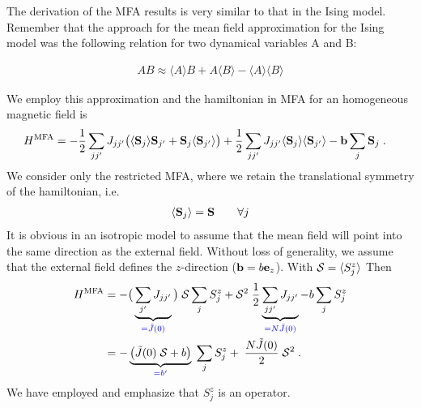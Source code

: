 The derivation of the MFA results is very similar to that in the Ising model. Remember that the approach for the mean field approximation for the Ising model was the following relation for two dynamical variables A and B:

\begin{align*}
AB \approx \langle A\rangle B + A\langle B\rangle - \langle A\rangle\langle B\rangle
\end{align*}

We employ this approximation and the  hamiltonian in MFA for an homogeneous magnetic field is
%
\begin{align}\label{eq:}
H^\text{MFA} &= -\frac{1}{2}\sum_{jj'} J_{jj'} \big(\langle \mathbf S_{j} \rangle\mathbf S_{j'} +
 \mathbf S_{j}  \langle \mathbf S_{j'} \rangle \big)+ \frac{1}{2}\sum_{jj'} J_{jj'} \langle \mathbf S_{j} \rangle\langle \mathbf S_{j'} \rangle - \mathbf b \sum_{j} \mathbf S_{j}\;.
\end{align}
%
We consider only the restricted MFA, where we retain the  translational symmetry of the 
hamiltonian, i.e.
%
\begin{align*}
\langle \mathbf S_{j} \rangle =\mathbf S \qquad \forall j
\end{align*}
%
It is obvious in an isotropic model to assume that the mean field will point into the same 
direction as the external field. Without loss of generality, 
we assume that the external field defines the $z$-direction ($\mathbf b = b\mathbf e_{z}$). With ${\cal S} = \langle S^{z}_{j} \rangle$
Then
\begin{align*}
H^\text{MFA} &= -  \big(\underbrace{
\sum_{j'} J_{jj'}
}_{\color{blue} =  \tilde J(0)} \big)\;{\cal S}\sum_{j} S^{z}_{j} + {\cal S}^{2} \;\frac{1}{2}\underbrace{
\sum_{jj'} J_{jj'} 
}_{\color{blue} = N \tilde J(0)} -  b \sum_{j} S^{z}_{j}\\
&= - \underbrace{
\big( \tilde J(0) \;{\cal S} + b\big)
}_{\color{blue} = b'}\;\sum_{j}  S_{j}^{z} + 
\;\frac{N \tilde J(0)}{2} \;{\cal S}^{2} \;.
\end{align*}
We have employed   and emphasize that
 $S^{z}_{j}$ is an operator.
 
